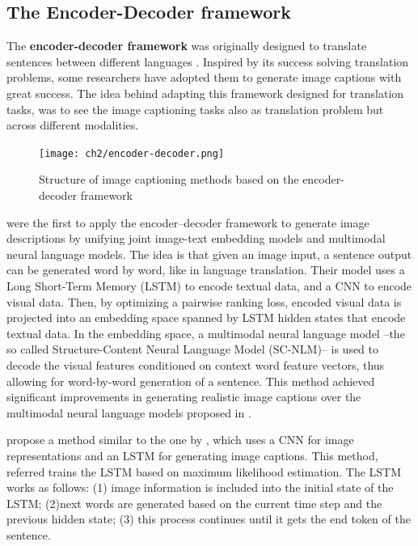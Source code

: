 \subsection{The Encoder-Decoder framework}\label{subsec:encoder-decoder_framework}

The \textbf{encoder-decoder framework} was originally designed to translate sentences between different languages \citep{Kalchbrenner2013, Sutskever2014, Cho2014}. Inspired by its success solving translation problems, some researchers have adopted them to generate image captions with great success. The idea behind adapting this framework designed for translation tasks, was to see the image captioning tasks also as translation problem but across different modalities. 

\begin{figure}[hpt]
	\centering
	\texttt{[image: ch2/encoder-decoder.png]}
	\caption{Structure of image captioning methods based on the encoder-decoder framework}
	\label{fig:encoder-decoder_framework}
\end{figure}

\citet{Kiros2014_LBL} were the first to apply the encoder–decoder framework to generate image descriptions by unifying joint image-text embedding models and multimodal neural language models. The idea is that given an image input, a sentence output can be generated word by word, like in language translation. Their model uses a Long Short-Term Memory (LSTM) \citep{Hochreiter1997} to encode textual data, and a CNN to encode visual data. Then, by optimizing a pairwise ranking loss, encoded visual data is projected into an embedding space spanned by LSTM  hidden states that encode textual data. In the embedding space, a multimodal neural language model --the so called Structure-Content Neural Language Model (SC-NLM)-- is used to decode the visual features conditioned on context word feature vectors, thus allowing for word-by-word generation of a sentence. This method achieved significant improvements in generating realistic image captions over the multimodal neural language models proposed in \citep{Kiros2014_VS}.

\citet{Vinyals2015} propose a method similar to the one by \citet{Kiros2014_VS}, which uses a CNN for image representations and an LSTM for generating image captions. This method, referred trains the LSTM based on maximum likelihood estimation. The LSTM works as follows: (1) image information is included into the initial state of the LSTM; (2)next words are generated based on the current time step and the previous hidden state; (3) this process continues until it gets the end token of the sentence. 

